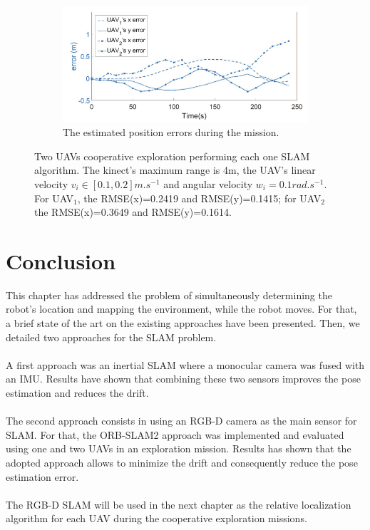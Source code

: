 \begin{figure}[H]
    \begin{subfigure}[t]{0.8\linewidth}
        \centering
        \includegraphics[width=\linewidth]{assets/2_23_c.png}
        \caption{{The estimated position errors during the mission.}}
        \label{fig:2.23c}
    \end{subfigure}
    \caption{Two UAVs cooperative exploration performing each one SLAM algorithm. The kinect's maximum range is 4m, the UAV's linear velocity $v_i \in [0.1, 0.2]m.s^{-1}$ and angular velocity $w_i=0.1 rad.s^{-1}$. For UAV$_1$, the RMSE(x)=0.2419 and RMSE(y)=0.1415; for UAV$_2$ the RMSE(x)=0.3649 and RMSE(y)=0.1614.}
    \label{fig:2.23}
\end{figure}
\section{Conclusion}
This chapter has addressed the problem of simultaneously determining the robot’s location and mapping the environment, while the robot moves. For that, a brief state of the art on the existing approaches have been presented. Then, we detailed two approaches for the SLAM problem.\\\\
A ﬁrst approach was an inertial SLAM where a monocular camera was fused with an IMU. Results have shown that combining these two sensors improves the pose estimation and reduces the drift.\\\\
The second approach consists in using an RGB-D camera as the main sensor for SLAM. For that, the ORB-SLAM2 approach was implemented and evaluated using one and two UAVs in an exploration mission. Results has shown that the adopted approach allows to minimize the drift and consequently reduce the pose estimation error.\\\\
The RGB-D SLAM will be used in the next chapter as the relative localization algorithm for each UAV during the cooperative exploration missions.